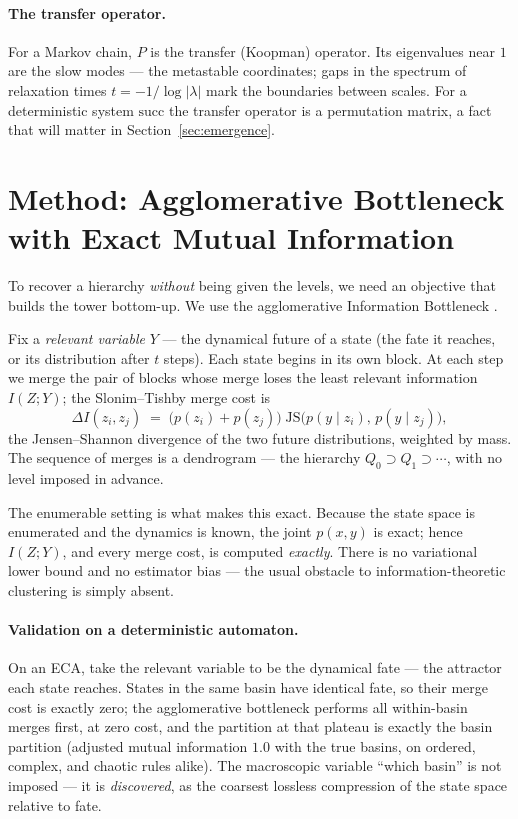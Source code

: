 \documentclass[11pt]{article}
\newcommand{\succf}{\mathrm{succ}}
\begin{document}
\paragraph{The transfer operator.}
For a Markov chain, $P$ is the transfer (Koopman) operator. Its eigenvalues
near $1$ are the slow modes --- the metastable coordinates; gaps in the
spectrum of relaxation times $t = -1/\log|\lambda|$ mark the boundaries between
scales. For a deterministic system $\succf$ the transfer operator is a
permutation matrix, a fact that will matter in Section~\ref{sec:emergence}.

\section{Method: Agglomerative Bottleneck with Exact Mutual Information}
\label{sec:method}

To recover a hierarchy \emph{without} being given the levels, we need an
objective that builds the tower bottom-up. We use the agglomerative
Information Bottleneck \citep{slonim2000aib,tishby1999ib}.

Fix a \emph{relevant variable} $Y$ --- the dynamical future of a state (the
fate it reaches, or its distribution after $t$ steps). Each state begins in its
own block. At each step we merge the pair of blocks whose merge loses the least
relevant information $I(Z;Y)$; the Slonim--Tishby merge cost is
\[
  \Delta I(z_i,z_j) \;=\; \big(p(z_i)+p(z_j)\big)\;
  \mathrm{JS}\big(p(y\mid z_i),\,p(y\mid z_j)\big),
\]
the Jensen--Shannon divergence of the two future distributions, weighted by
mass. The sequence of merges is a dendrogram --- the hierarchy
$Q_0 \supset Q_1 \supset \cdots$, with no level imposed in advance.

The enumerable setting is what makes this exact. Because the state space is
enumerated and the dynamics is known, the joint $p(x,y)$ is exact; hence
$I(Z;Y)$, and every merge cost, is computed \emph{exactly}. There is no
variational lower bound and no estimator bias --- the usual obstacle to
information-theoretic clustering is simply absent.

\paragraph{Validation on a deterministic automaton.}
On an ECA, take the relevant variable to be the dynamical fate --- the
attractor each state reaches. States in the same basin have identical fate, so
their merge cost is exactly zero; the agglomerative bottleneck performs all
within-basin merges first, at zero cost, and the partition at that plateau is
exactly the basin partition (adjusted mutual information $1.0$ with the true
basins, on ordered, complex, and chaotic rules alike). The macroscopic variable
``which basin'' is not imposed --- it is \emph{discovered}, as the coarsest
lossless compression of the state space relative to fate.
\end{document}

